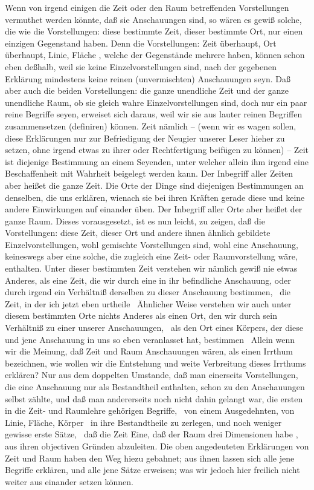 Wenn von irgend einigen die Zeit oder den Raum betreffenden Vorstellungen vermuthet werden könnte, daß sie Anschauungen sind, so wären es gewiß solche, die wie die Vorstellungen: diese bestimmte Zeit, dieser bestimmte Ort, nur einen einzigen Gegenstand haben. Denn die Vorstellungen: Zeit überhaupt, Ort überhaupt, Linie, Fläche \usw , welche der Gegenstände mehrere haben, können schon eben deßhalb, weil sie keine Einzelvorstellungen sind, nach der gegebenen Erklärung mindestens keine reinen (unvermischten) Anschauungen seyn. Daß aber auch die beiden Vorstellungen: die ganze unendliche Zeit und der ganze unendliche Raum, ob sie gleich wahre Einzelvorstellungen sind, doch nur ein paar reine Begriffe seyen, erweiset sich daraus, weil wir sie aus lauter reinen Begriffen zusammensetzen (definiren) können. Zeit nämlich -- (wenn wir es wagen sollen, diese Erklärungen nur zur Befriedigung der Neugier unserer Leser hieher zu setzen, ohne irgend etwas zu ihrer  oder Rechtfertigung beifügen zu können) -- Zeit ist diejenige Bestimmung an einem Seyenden, unter welcher allein ihm irgend eine Beschaffenheit mit Wahrheit beigelegt werden kann. Der Inbegriff aller Zeiten aber heißet die ganze Zeit. Die Orte der Dinge sind diejenigen Bestimmungen an denselben, die uns erklären, wienach sie bei ihren Kräften gerade diese und keine andere Einwirkungen auf einander üben. Der Inbegriff aller Orte aber heißet der ganze Raum. Dieses vorausgesetzt, ist es nun leicht, zu zeigen, daß die Vorstellungen: diese Zeit, dieser Ort und andere ihnen ähnlich gebildete Einzelvorstellungen, wohl gemischte Vorstellungen sind, wohl eine Anschauung, keineswegs aber eine solche, die zugleich eine Zeit- oder Raumvorstellung wäre, enthalten. Unter dieser bestimmten Zeit verstehen wir nämlich gewiß nie etwas Anderes, als eine Zeit, die wir durch eine in ihr befindliche Anschauung, oder durch irgend ein Verhältniß derselben zu dieser Anschauung bestimmen, \zB\ die  Zeit, in der ich jetzt eben urtheile \udgl\ Ähnlicher Weise verstehen wir auch unter diesem bestimmten Orte nichts Anderes als einen Ort, den wir durch sein Verhältniß zu einer unserer Anschauungen, \zB\ als den Ort eines Körpers, der diese und jene Anschauung in uns so eben veranlasset hat, bestimmen \usw\ Allein wenn wir die Meinung, daß Zeit und Raum Anschauungen wären, als einen Irrthum bezeichnen, wie wollen wir die Entstehung und weite Verbreitung dieses Irrthums erklären? Nur aus dem doppelten Umstande, daß man einerseits Vorstellungen, die eine Anschauung nur als Bestandtheil enthalten, schon zu den Anschauungen selbst zählte, und daß man andererseits noch nicht dahin gelangt war, die ersten in die Zeit- und Raumlehre gehörigen Begriffe, \zB\ von einem Ausgedehnten, von Linie, Fläche, Körper \udgl\ in ihre Bestandtheile zu zerlegen, und noch weniger gewisse erste Sätze, \zB\ daß die Zeit Eine, daß der Raum drei Dimensionen habe \usw , aus ihren objectiven Gründen abzuleiten. Die oben angedeuteten Erklärungen von Zeit und Raum haben den Weg hiezu gebahnet; aus ihnen lassen sich alle jene Begriffe erklären, und alle jene Sätze erweisen; was wir jedoch hier freilich nicht weiter aus einander setzen können. \par
